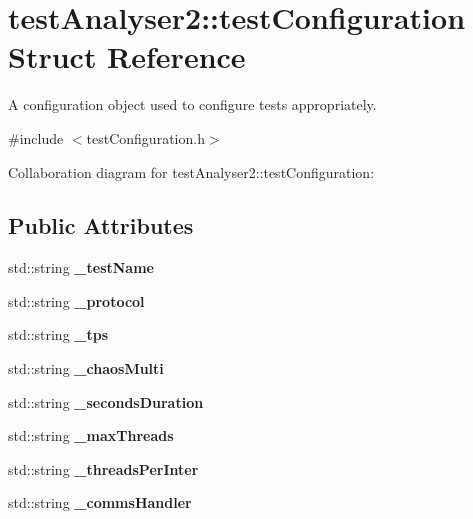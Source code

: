 \hypertarget{structtestAnalyser2_1_1testConfiguration}{}\section{test\+Analyser2\+::test\+Configuration Struct Reference}
\label{structtestAnalyser2_1_1testConfiguration}


A configuration object used to configure tests appropriately.  




{\ttfamily \#include $<$test\+Configuration.\+h$>$}



Collaboration diagram for test\+Analyser2\+::test\+Configuration\+:
\subsection*{Public Attributes}
\begin{DoxyCompactItemize}
\item 
\mbox{\label{structtestAnalyser2_1_1testConfiguration_a3b00041f72c04500935b4af045078e19}} 
std\+::string {\bfseries \+\_\+test\+Name}
\item 
\mbox{\label{structtestAnalyser2_1_1testConfiguration_a126d8bf87f3a33152e9820835005dc13}} 
std\+::string {\bfseries \+\_\+protocol}
\item 
\mbox{\label{structtestAnalyser2_1_1testConfiguration_a902e3569a3c67a6235c342cb488146b6}} 
std\+::string {\bfseries \+\_\+tps}
\item 
\mbox{\label{structtestAnalyser2_1_1testConfiguration_a4b390950acc1db3dc100812040192821}} 
std\+::string {\bfseries \+\_\+chaos\+Multi}
\item 
\mbox{\label{structtestAnalyser2_1_1testConfiguration_a65bf536bc9a70034acadb6bb7e1c2110}} 
std\+::string {\bfseries \+\_\+seconds\+Duration}
\item 
\mbox{\label{structtestAnalyser2_1_1testConfiguration_a922192cb3814c5eb4d8183b6d2be8bd7}} 
std\+::string {\bfseries \+\_\+max\+Threads}
\item 
\mbox{\label{structtestAnalyser2_1_1testConfiguration_a9e149a5beb5b64c69000b241f390aaa3}} 
std\+::string {\bfseries \+\_\+threads\+Per\+Inter}
\item 
\mbox{\label{structtestAnalyser2_1_1testConfiguration_a7b94b43ebbe5746258501acb8fdce0c0}} 
std\+::string {\bfseries \+\_\+comms\+Handler}
\end{DoxyCompactItemize}


